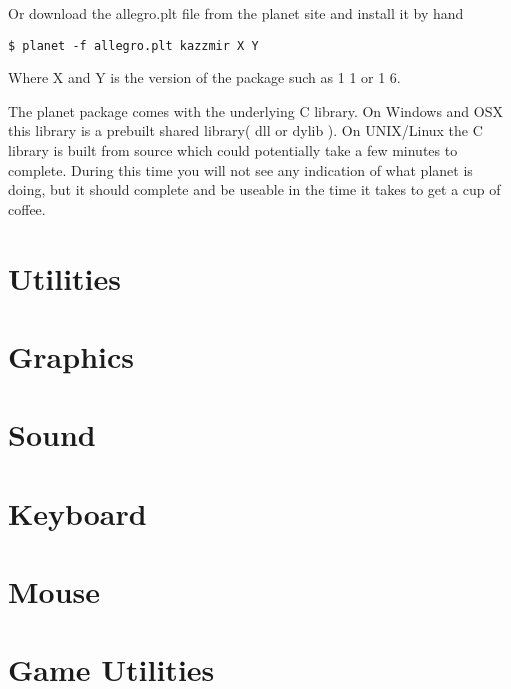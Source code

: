 \documentclass{book}
\begin{document}
\begin{schemeregion}
Or download the allegro.plt file from the planet site and install it by hand

\begin{verbatim}
$ planet -f allegro.plt kazzmir X Y
\end{verbatim}

Where X and Y is the version of the package such as 1 1 or 1 6.

The planet package comes with the underlying C library. On Windows and OSX this library is a prebuilt shared library( dll or dylib ). On UNIX/Linux the C library is built from source which could potentially take a few minutes to complete. During this time you will not see any indication of what planet is doing, but it should complete and be useable in the time it takes to get a cup of coffee.

\tableofcontents

\chapter{Utilities}



\chapter{Graphics}
\hypertarget{graphics-chapter}{}



\chapter{Sound}



\chapter{Keyboard}



\chapter{Mouse}



\chapter{Game Utilities}
\hypertarget{game-chapter}{}




\end{schemeregion}
\end{document}
